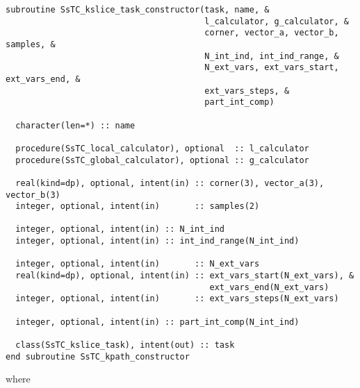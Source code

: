 \documentclass[10pt,a4paper]{article}
\begin{document}
\begin{lstlisting}[caption={Interface of the ``kslice" constructor.},captionpos=b]
subroutine SsTC_kslice_task_constructor(task, name, &
                                        l_calculator, g_calculator, &
                                        corner, vector_a, vector_b, samples, &
                                        N_int_ind, int_ind_range, &
                                        N_ext_vars, ext_vars_start, ext_vars_end, &
                                        ext_vars_steps, &
                                        part_int_comp)

  character(len=*) :: name

  procedure(SsTC_local_calculator), optional  :: l_calculator
  procedure(SsTC_global_calculator), optional :: g_calculator

  real(kind=dp), optional, intent(in) :: corner(3), vector_a(3), vector_b(3)
  integer, optional, intent(in)       :: samples(2)

  integer, optional, intent(in) :: N_int_ind
  integer, optional, intent(in) :: int_ind_range(N_int_ind)

  integer, optional, intent(in)       :: N_ext_vars
  real(kind=dp), optional, intent(in) :: ext_vars_start(N_ext_vars), &
                                         ext_vars_end(N_ext_vars)
  integer, optional, intent(in)       :: ext_vars_steps(N_ext_vars)

  integer, optional, intent(in) :: part_int_comp(N_int_ind)

  class(SsTC_kslice_task), intent(out) :: task
end subroutine SsTC_kpath_constructor
\end{lstlisting}
where
\end{document}
